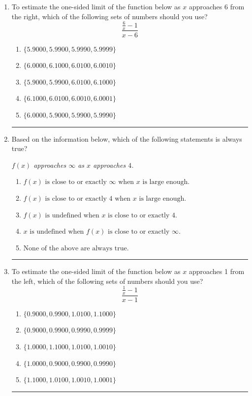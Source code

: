 \documentclass[14pt]{extbook}
\newcommand{\litem}[1]{\item#1\hspace*{-1cm}\rule{\textwidth}{0.4pt}}
\begin{document}
\begin{enumerate}
\litem{
To estimate the one-sided limit of the function below as $x$ approaches 6 from the right, which of the following sets of numbers should you use?\[ \frac{\frac{6}{x} - 1}{x - 6} \]\begin{enumerate}[label=\Alph*.]
\item \( \{ 5.9000, 5.9900, 5.9990, 5.9999 \} \)
\item \( \{ 6.0000, 6.1000, 6.0100, 6.0010 \} \)
\item \( \{ 5.9000, 5.9900, 6.0100, 6.1000 \} \)
\item \( \{ 6.1000, 6.0100, 6.0010, 6.0001 \} \)
\item \( \{ 6.0000, 5.9000, 5.9900, 5.9990 \} \)

\end{enumerate} }
\litem{
Based on the information below, which of the following statements is always true?
\begin{center}
    \textit{ $f(x)$ approaches $\infty$ as $x$ approaches $4$. }
\end{center}
\begin{enumerate}[label=\Alph*.]
\item \( f(x) \text{ is close to or exactly } \infty \text{ when } x \text{ is large enough}. \)
\item \( f(x) \text{ is close to or exactly } 4 \text{ when } x \text{ is large enough}. \)
\item \( f(x) \text{ is undefined when } x \text{ is close to or exactly } 4. \)
\item \( x \text{ is undefined when } f(x) \text{ is close to or exactly } \infty. \)
\item \( \text{None of the above are always true.} \)

\end{enumerate} }
\litem{
To estimate the one-sided limit of the function below as $x$ approaches 1 from the left, which of the following sets of numbers should you use?\[ \frac{\frac{1}{x} - 1}{x - 1} \]\begin{enumerate}[label=\Alph*.]
\item \( \{ 0.9000, 0.9900, 1.0100, 1.1000 \} \)
\item \( \{ 0.9000, 0.9900, 0.9990, 0.9999 \} \)
\item \( \{ 1.0000, 1.1000, 1.0100, 1.0010 \} \)
\item \( \{ 1.0000, 0.9000, 0.9900, 0.9990 \} \)
\item \( \{ 1.1000, 1.0100, 1.0010, 1.0001 \} \)


\end{enumerate}}
\end{enumerate}
\end{document}
